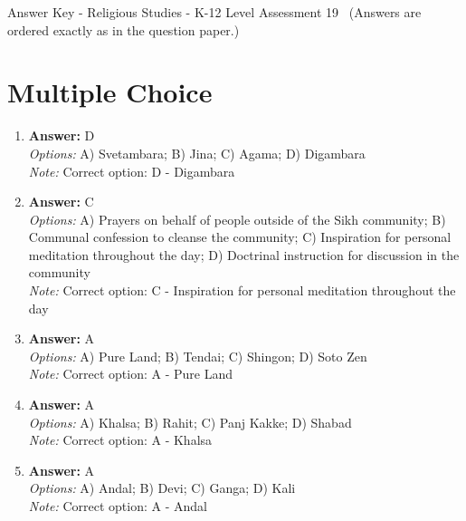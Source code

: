 \documentclass[12pt]{article}
\begin{document}
\begin{center}
Answer Key - Religious Studies - K-12 Level Assessment 19 \
\small (Answers are ordered exactly as in the question paper.)
\end{center}

\section*{Multiple Choice}
\begin{enumerate}[label=\arabic*.]
\item \textbf{Answer:} D
\\ \textit{Options:} A) Svetambara; B) Jina; C) Agama; D) Digambara
\\ \textit{Note:} Correct option: D - Digambara
\item \textbf{Answer:} C
\\ \textit{Options:} A) Prayers on behalf of people outside of the Sikh community; B) Communal confession to cleanse the community; C) Inspiration for personal meditation throughout the day; D) Doctrinal instruction for discussion in the community
\\ \textit{Note:} Correct option: C - Inspiration for personal meditation throughout the day
\item \textbf{Answer:} A
\\ \textit{Options:} A) Pure Land; B) Tendai; C) Shingon; D) Soto Zen
\\ \textit{Note:} Correct option: A - Pure Land
\item \textbf{Answer:} A
\\ \textit{Options:} A) Khalsa; B) Rahit; C) Panj Kakke; D) Shabad
\\ \textit{Note:} Correct option: A - Khalsa
\item \textbf{Answer:} A
\\ \textit{Options:} A) Andal; B) Devi; C) Ganga; D) Kali
\\ \textit{Note:} Correct option: A - Andal
\end{enumerate}
\end{document}
